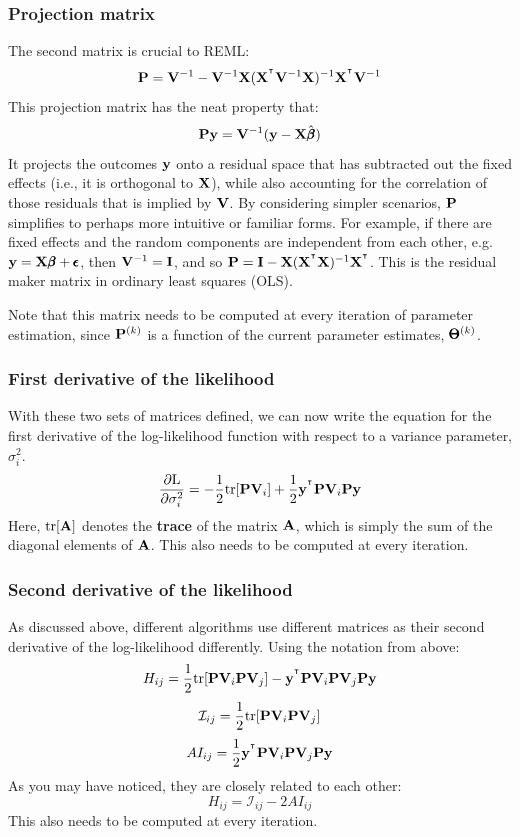 \documentclass[12pt]{article}
\begin{document}
\subsubsection{Projection matrix}
The second matrix is crucial to REML:
$$
\mathbf{P} = \mathbf{V}^{-1} -
\mathbf{V}^{-1} \mathbf{X} (\mathbf{X}^{^\intercal} \mathbf{V}^{-1} \mathbf{X})^{-1} \mathbf{X}^{^\intercal} \mathbf{V}^{-1}
$$
This projection matrix has the neat property that:
$$ \mathbf{P} \mathbf{y} = \mathbf{V}^{-1} (\mathbf{y} - \mathbf{X} \hat{\pmb{\beta}}) $$
It projects the outcomes $\mathbf{y}$ onto a residual space that has subtracted out the fixed effects (i.e., it is orthogonal to $\mathbf{X}$), while also accounting for the correlation of those residuals that is implied by $\mathbf{V}$.
By considering simpler scenarios, $\mathbf{P}$ simplifies to perhaps more intuitive or familiar forms.
For example, if there are fixed effects and the random components are independent from each other, e.g. $\mathbf{y} = \mathbf{X} \pmb{\beta} + \pmb{\epsilon}$, then $\mathbf{V}^{-1} = \mathbf{I}$, and so $\mathbf{P} = \mathbf{I} - \mathbf{X} (\mathbf{X}^{^\intercal} \mathbf{X})^{-1} \mathbf{X}^{^\intercal}$.
This is the residual maker matrix in ordinary least squares (OLS).

Note that this matrix needs to be computed at every iteration of parameter estimation, since $\mathbf{P}^{(k)}$ is a function of the current parameter estimates, $\pmb{\Theta}^{(k)}$.

\subsubsection{First derivative of the likelihood}
With these two sets of matrices defined, we can now write the equation for the first derivative of the log-likelihood function with respect to a variance parameter, $\sigma^2_i$.
$$
\frac{\partial \mathrm{L}}{\partial \sigma^2_i} =
- \frac{1}{2} \mathrm{tr}[\mathbf{P} \mathbf{V}_i] +
\frac{1}{2} \mathbf{y}^{^\intercal} \mathbf{P} \mathbf{V}_i \mathbf{P} \mathbf{y}
$$
Here, $\mathrm{tr}[\mathbf{A}]$ denotes the \textbf{trace} of the matrix $\mathbf{A}$, which is simply the sum of the diagonal elements of $\mathbf{A}$.
This also needs to be computed at every iteration.

\subsubsection{Second derivative of the likelihood}
As discussed above, different algorithms use different matrices as their second derivative of the log-likelihood differently.
Using the notation from above:
$$ H_{ij} =
\frac{1}{2} \mathrm{tr}[\mathbf{P} \mathbf{V}_i \mathbf{P} \mathbf{V}_j] - 
\mathbf{y}^{^\intercal} \mathbf{P} \mathbf{V}_i \mathbf{P} \mathbf{V}_j \mathbf{P} \mathbf{y}
$$
$$ \mathcal{I}_{ij} =
\frac{1}{2} \mathrm{tr}[\mathbf{P} \mathbf{V}_i \mathbf{P} \mathbf{V}_j]
$$
$$ AI_{ij} =
\frac{1}{2}
\mathbf{y}^{^\intercal} \mathbf{P} \mathbf{V}_i \mathbf{P} \mathbf{V}_j \mathbf{P} \mathbf{y}
$$
As you may have noticed, they are closely related to each other:
$$
H_{ij} = \mathcal{I}_{ij} - 2 AI_{ij}
$$
This also needs to be computed at every iteration.



\end{document}
